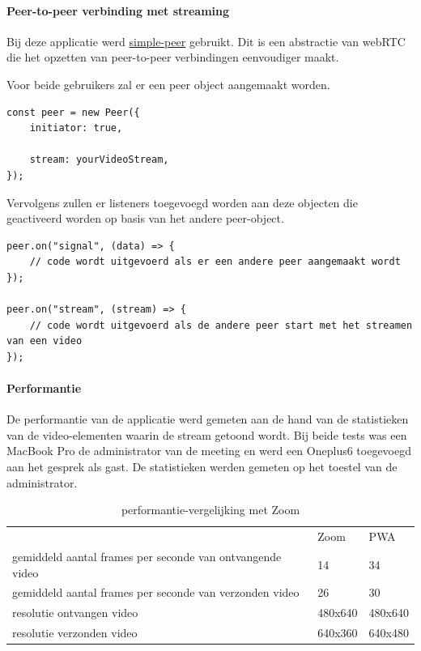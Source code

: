 		\paragraph{Peer-to-peer verbinding met streaming}
			Bij deze applicatie werd \href{https://github.com/feross/simple-peer}{simple-peer} gebruikt. Dit is een abstractie van webRTC die het opzetten van peer-to-peer verbindingen eenvoudiger maakt.
			
			Voor beide gebruikers zal er een peer object aangemaakt worden.

\begin{lstlisting}
const peer = new Peer({
	initiator: true,

	stream: yourVideoStream,
});
\end{lstlisting}
			
			Vervolgens zullen er listeners toegevoegd worden aan deze objecten die geactiveerd worden op basis van het andere peer-object.
			
\begin{lstlisting}
peer.on("signal", (data) => {
	// code wordt uitgevoerd als er een andere peer aangemaakt wordt
});

peer.on("stream", (stream) => {
	// code wordt uitgevoerd als de andere peer start met het streamen van een video
});
\end{lstlisting}

		\paragraph{Performantie}
		
			De performantie van de applicatie werd gemeten aan de hand van de statistieken van de video-elementen waarin de stream getoond wordt. Bij beide tests was een MacBook Pro de administrator van de meeting en werd een Oneplus6 toegevoegd aan het gesprek als gast. De statistieken werden gemeten op het toestel van de administrator.
			
			\begin{table}[H]
			\centering
			\begin{tabular}{lll}													& Zoom 			& PWA \\
				gemiddeld aantal frames per seconde van ontvangende video 	 & 14				&  34 \\
				gemiddeld aantal frames per seconde van verzonden video		   & 26				   & 30	 \\
				resolutie ontvangen video  						  & 480x640 	&  480x640  \\
				resolutie verzonden video						   & 640x360	& 	640x480\\
			\end{tabular}	
			\caption{performantie-vergelijking met Zoom}
			\end{table}
	

